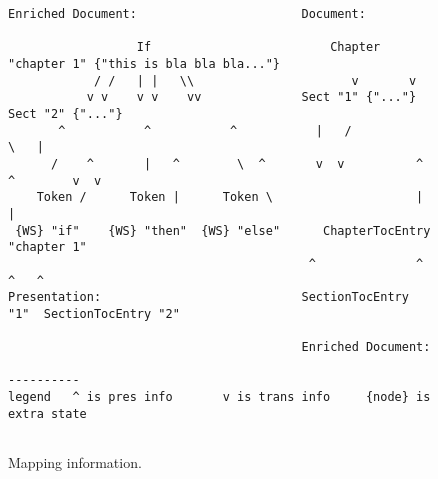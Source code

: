 \begin{figure}
\begin{center}
\begin{center}
\begin{footnotesize}
\begin{verbatim}
Enriched Document:                       Document:                                                                                            
                                                                                            
                  If                         Chapter "chapter 1" {"this is bla bla bla..."} 
            / /   | |   \\                      v       v                                     
           v v    v v    vv              Sect "1" {"..."}     Sect "2" {"..."}                
       ^           ^           ^           |   /                    \   |                            
      /    ^       |   ^        \  ^       v  v          ^  ^        v  v                          
    Token /      Token |      Token \                    |  |                             
 {WS} "if"    {WS} "then"  {WS} "else"      ChapterTocEntry "chapter 1"                     
                                          ^              ^                 ^   ^              
Presentation:                            SectionTocEntry "1"  SectionTocEntry "2"           
                                                                                            
                                         Enriched Document:                                 

----------                                                                        
legend   ^ is pres info       v is trans info     {node} is extra state            
                                                                                  
\end{verbatim}  
\end{footnotesize}                                                                  
\end{center}                                                                      
\caption{Mapping information.}\label{info}                          
\end{center}                                                                      
\end{figure}

